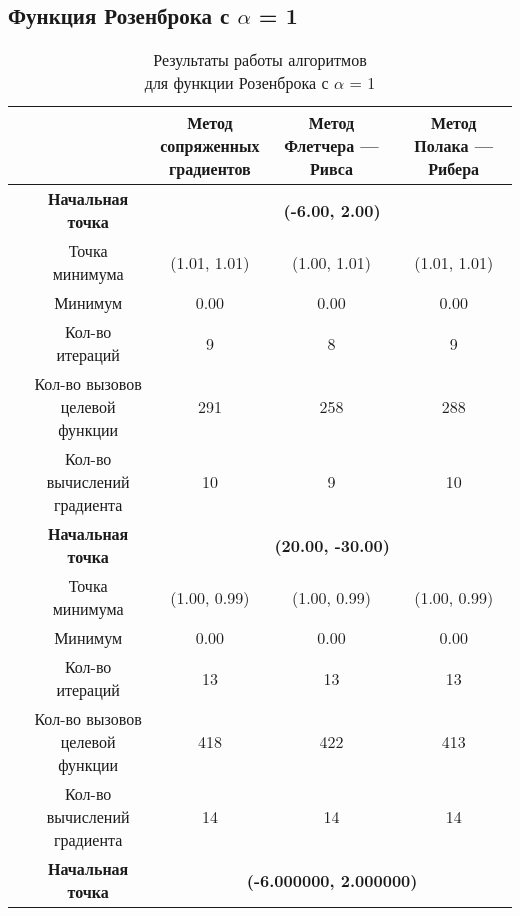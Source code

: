             \subsection{Функция Розенброка с $\alpha$ = 1}

\begin{table}[H]
        \centering
        \vspace*{-1.5em}
        \caption{Результаты работы алгоритмов\\для функции Розенброка с $\alpha$ = 1}
        \footnotesize
        \begin{tabular}{|c|c|c|c|c|}
        \hline
        & &\makecell{Метод\\сопряженных\\градиентов} &\makecell{Метод\\Флетчера --- Ривса} &\makecell{Метод\\Полака --- Рибера} \\
        \hline
	\multirow{10}{*}{\rotatebox[origin=c]{90}{$\varepsilon = 0.01$}}&\textbf{Начальная точка} &\multicolumn{3}{c|}{\textbf{(-6.00, 2.00)}}\\
	\cline{2-5}
	&Точка минимума &(1.01, 1.01) &(1.00, 1.01) &(1.01, 1.01) \\ 
	\cline{2-5}
	&Минимум &0.00 &0.00 &0.00 \\ 
	\cline{2-5}
	&Кол-во итераций &9 &8 &9 \\ 
	\cline{2-5}
	&\makecell{Кол-во вызовов\\целевой функции} &291 &258 &288 \\ 
	\cline{2-5}
	&\makecell{Кол-во вычислений\\градиента} &10 &9 &10 \\ 
	\cline{2-5}
\cline{2-5}&\textbf{Начальная точка} &\multicolumn{3}{c|}{\textbf{(20.00, -30.00)}}\\
	\cline{2-5}
	&Точка минимума &(1.00, 0.99) &(1.00, 0.99) &(1.00, 0.99) \\ 
	\cline{2-5}
	&Минимум &0.00 &0.00 &0.00 \\ 
	\cline{2-5}
	&Кол-во итераций &13 &13 &13 \\ 
	\cline{2-5}
	&\makecell{Кол-во вызовов\\целевой функции} &418 &422 &413 \\ 
	\cline{2-5}
	&\makecell{Кол-во вычислений\\градиента} &14 &14 &14 \\ 
	\cline{2-5}
	\hline
	\multirow{10}{*}{\rotatebox[origin=c]{90}{$\varepsilon = 1e-06$}}&\textbf{Начальная точка} &\multicolumn{3}{c|}{\textbf{(-6.000000, 2.000000)}}\\

\end{tabular}
\end{table}
